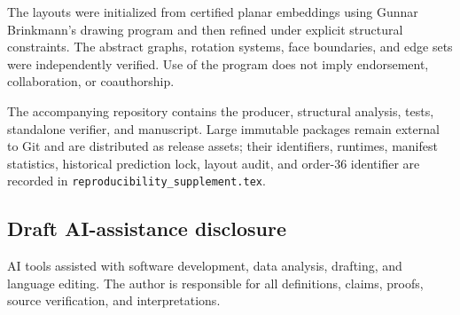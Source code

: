 The layouts were initialized from certified planar embeddings using Gunnar
Brinkmann's drawing program and then refined under explicit structural
constraints.  The abstract graphs, rotation systems, face boundaries, and edge
sets were independently verified.  Use of the program does not imply
endorsement, collaboration, or coauthorship.

The accompanying repository contains the producer, structural analysis, tests,
standalone verifier, and manuscript.  Large immutable packages remain external
to Git and are distributed as release assets; their identifiers, runtimes,
manifest statistics, historical prediction lock, layout audit, and order-36
identifier are recorded in
\texttt{reproducibility\_supplement.tex}.

\subsection*{Draft AI-assistance disclosure}

AI tools assisted with software development, data analysis, drafting, and
language editing.  The author is responsible for all definitions, claims,
proofs, source verification, and interpretations.
